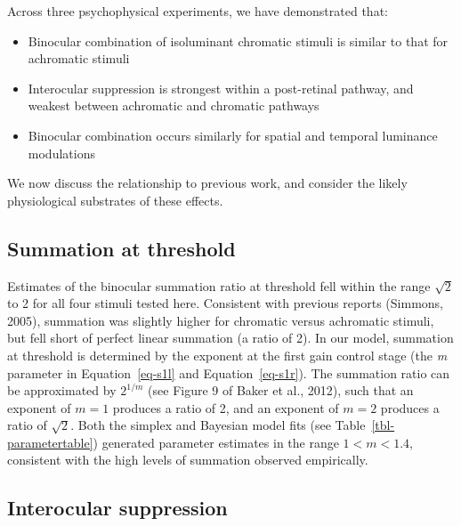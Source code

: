 \documentclass[
  letterpaper,
  DIV=11,
  numbers=noendperiod]{scrartcl}
\providecommand{\tightlist}{%
  \setlength{\itemsep}{0pt}\setlength{\parskip}{0pt}}\usepackage{longtable,booktabs,array}
\begin{document}
Across three psychophysical experiments, we have demonstrated that:

\begin{itemize}
\tightlist
\item
  Binocular combination of isoluminant chromatic stimuli is similar to
  that for achromatic stimuli
\item
  Interocular suppression is strongest within a post-retinal pathway,
  and weakest between achromatic and chromatic pathways
\item
  Binocular combination occurs similarly for spatial and temporal
  luminance modulations
\end{itemize}

We now discuss the relationship to previous work, and consider the
likely physiological substrates of these effects.

\hypertarget{summation-at-threshold}{%
\subsection{Summation at threshold}\label{summation-at-threshold}}

Estimates of the binocular summation ratio at threshold fell within the
range \(\sqrt{2}\) to 2 for all four stimuli tested here. Consistent
with previous reports (Simmons, 2005), summation was slightly higher for
chromatic versus achromatic stimuli, but fell short of perfect linear
summation (a ratio of 2). In our model, summation at threshold is
determined by the exponent at the first gain control stage (the \emph{m}
parameter in Equation~\ref{eq-s1l} and Equation~\ref{eq-s1r}). The
summation ratio can be approximated by \(2^{1/m}\) (see Figure 9 of
Baker et al., 2012), such that an exponent of \(m=1\) produces a ratio
of 2, and an exponent of \(m = 2\) produces a ratio of \(\sqrt{2}\).
Both the simplex and Bayesian model fits (see
Table~\ref{tbl-parametertable}) generated parameter estimates in the
range \(1 < m < 1.4\), consistent with the high levels of summation
observed empirically.

\hypertarget{interocular-suppression}{%
\subsection{Interocular suppression}\label{interocular-suppression}}
\end{document}
